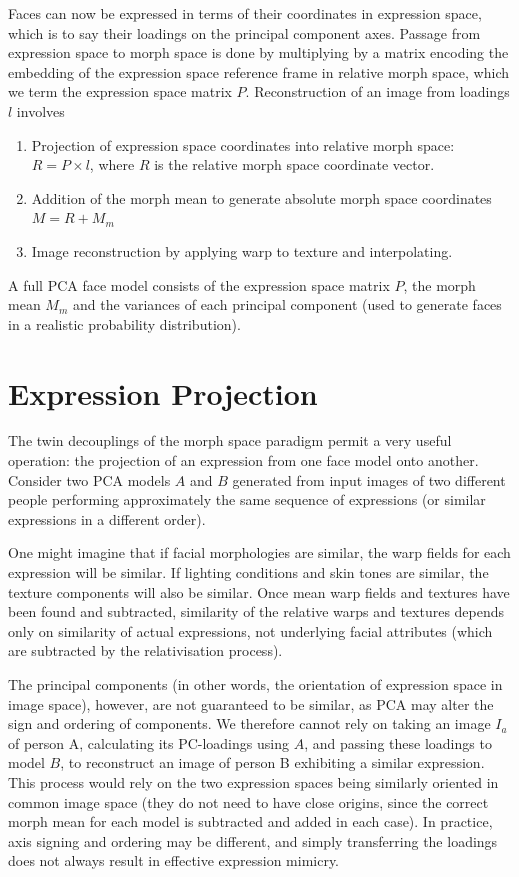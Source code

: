 \documentclass[runningheads]{llncs}
\begin{document}
Faces can now be expressed in terms of their coordinates in expression space, which is to say their loadings on the principal component axes. Passage from expression space to morph space is done by multiplying by a matrix encoding the embedding of the expression space reference frame in relative morph space, which we term the expression space matrix $P$. Reconstruction of an image from loadings $l$ involves

\begin{enumerate}
\item	Projection of expression space coordinates into relative morph space: $R = P \times l$, where $R$ is the relative morph space coordinate vector.
\item	Addition of the morph mean to generate absolute morph space coordinates $M = R + M_m$
\item	Image reconstruction by applying warp to texture and interpolating.
\end{enumerate}

A full PCA face model consists of the expression space matrix $P$, the morph mean $M_m$ and the variances of each principal component (used to generate faces in a realistic probability distribution).



\section{Expression Projection}

The twin decouplings of the morph space paradigm permit a very useful operation: the projection of an expression from one face model onto another. Consider two PCA models $A$ and $B$ generated from input images of two different people performing approximately the same sequence of expressions (or similar expressions in a different order).

 One might imagine that if facial morphologies are similar, the warp fields for each expression will be similar. If lighting conditions and skin tones are similar, the texture components will also be similar. Once mean warp fields and textures have been found and subtracted, similarity of the relative warps and textures depends only on similarity of actual expressions, not underlying facial attributes (which are subtracted by the relativisation process).
 
The principal components (in other words, the orientation of expression space in image space), however, are not guaranteed to be similar, as PCA may alter the sign and ordering of components\cite{jolliffe2002principal}. We therefore cannot rely on taking an image $I_a$ of person A, calculating its PC-loadings using $A$, and passing these loadings to model $B$, to reconstruct an image of person B exhibiting a similar expression. This process would rely on the two expression spaces being similarly oriented in common image space (they do not need to have close origins, since the correct morph mean for each model is subtracted and added in each case). In practice, axis signing and ordering may be different, and simply transferring the loadings does not always result in effective expression mimicry.
\end{document}
